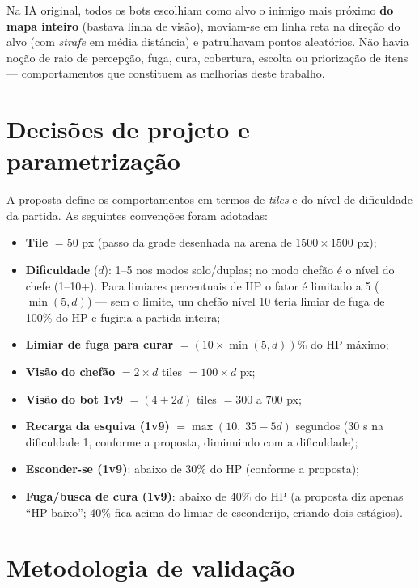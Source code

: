 \documentclass[a4paper,12pt]{article}
\begin{document}
Na IA original, todos os bots escolhiam como alvo o inimigo mais próximo \textbf{do mapa
inteiro} (bastava linha de visão), moviam-se em linha reta na direção do alvo (com
\textit{strafe} em média distância) e patrulhavam pontos aleatórios. Não havia noção de raio
de percepção, fuga, cura, cobertura, escolta ou priorização de itens --- comportamentos que
constituem as melhorias deste trabalho.

\section{Decisões de projeto e parametrização}

A proposta define os comportamentos em termos de \textit{tiles} e do nível de dificuldade da
partida. As seguintes convenções foram adotadas:

\begin{itemize}
  \item \textbf{Tile} $= 50$ px (passo da grade desenhada na arena de $1500 \times 1500$ px);
  \item \textbf{Dificuldade} ($d$): 1--5 nos modos solo/duplas; no modo chefão é o nível do
        chefe (1--10+). Para limiares percentuais de HP o fator é limitado a 5
        ($\min(5, d)$) --- sem o limite, um chefão nível 10 teria limiar de fuga de 100\% do
        HP e fugiria a partida inteira;
  \item \textbf{Limiar de fuga para curar} $= (10 \times \min(5, d))\%$ do HP máximo;
  \item \textbf{Visão do chefão} $= 2 \times d$ tiles $= 100 \times d$ px;
  \item \textbf{Visão do bot 1v9} $= (4 + 2d)$ tiles $= 300$ a $700$ px;
  \item \textbf{Recarga da esquiva (1v9)} $= \max(10,\; 35 - 5d)$ segundos
        (30 s na dificuldade 1, conforme a proposta, diminuindo com a dificuldade);
  \item \textbf{Esconder-se (1v9)}: abaixo de 30\% do HP (conforme a proposta);
  \item \textbf{Fuga/busca de cura (1v9)}: abaixo de 40\% do HP (a proposta diz apenas
        ``HP baixo''; 40\% fica acima do limiar de esconderijo, criando dois estágios).
\end{itemize}

\section{Metodologia de validação}
\end{document}
